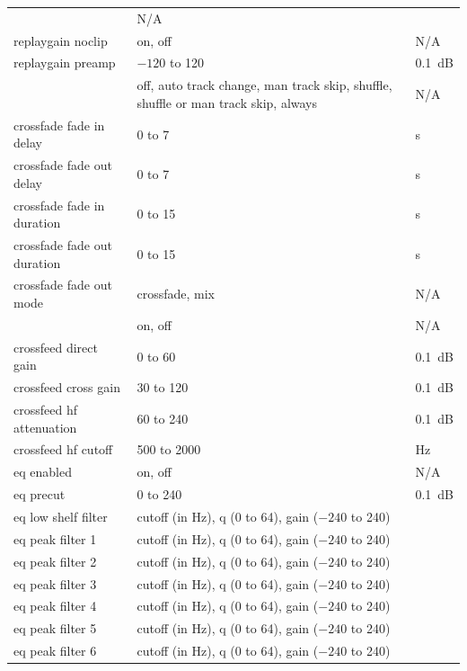 \begin{center}
\begin{longtable}{>{\raggedright}p{}>{\raggedright}p{}p{}}
                                        & N/A\\
      replaygain noclip
                    & on, off           & N/A\\
      replaygain preamp
                    & $-120$ to 120     & 0.1~dB\\
%
      \opt{crossfade}{
      crossfade     & off, auto track change, man track skip, shuffle,
                    shuffle or man track skip, always
                                        & N/A\\
      crossfade fade in delay
                    & 0 to 7            & s\\
      crossfade fade out delay
                    & 0 to 7            & s\\
      crossfade fade in duration
                    & 0 to 15           & s\\
      crossfade fade out duration
                    & 0 to 15           & s\\
      crossfade fade out mode
                    & crossfade, mix    & N/A\\
      }
%
      crossfeed     & on, off           & N/A\\
      crossfeed direct gain
                    & 0 to 60           & 0.1~dB\\
      crossfeed cross gain
                    & 30 to 120         & 0.1~dB\\
      crossfeed hf attenuation
                    & 60 to 240         & 0.1~dB\\
      crossfeed hf cutoff
                    & 500 to 2000       & Hz\\
%
      eq enabled    & on, off           & N/A\\
      eq precut     & 0 to 240          & 0.1~dB\\
      eq low shelf filter & cutoff (in Hz), q (0 to 64), gain ($-240$ to 240)\\
      eq peak filter 1 & cutoff (in Hz), q (0 to 64), gain ($-240$ to 240)\\
      eq peak filter 2 & cutoff (in Hz), q (0 to 64), gain ($-240$ to 240)\\
      eq peak filter 3 & cutoff (in Hz), q (0 to 64), gain ($-240$ to 240)\\
      eq peak filter 4 & cutoff (in Hz), q (0 to 64), gain ($-240$ to 240)\\
      eq peak filter 5 & cutoff (in Hz), q (0 to 64), gain ($-240$ to 240)\\
      eq peak filter 6 & cutoff (in Hz), q (0 to 64), gain ($-240$ to 240)\\

\end{longtable}
\end{center}
